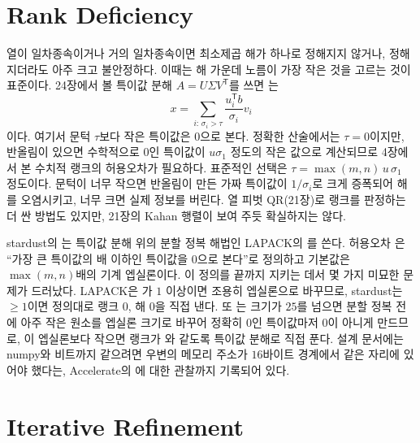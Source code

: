 \section{Rank Deficiency}
\label{sec:rank-deficient}

열이 일차종속이거나 거의 일차종속이면 최소제곱 해가 하나로 정해지지 않거나, 정해지더라도 아주 크고 불안정하다. 이때는 해 가운데 노름이 가장 작은 것을 고르는 것이 표준이다. 24장에서 볼 특이값 분해 $A=U\Sigma V^{\mathsf T}$를 쓰면 는
\[
x=\sum_{i:\,\sigma_i>\tau}\frac{u_i^{\mathsf T}b}{\sigma_i}v_i
\]
이다. 여기서 문턱 $\tau$보다 작은 특이값은 $0$으로 본다. 정확한 산술에서는 $\tau=0$이지만, 반올림이 있으면 수학적으로 $0$인 특이값이 $u\sigma_1$ 정도의 작은 값으로 계산되므로 4장에서 본 수치적 랭크의 허용오차가 필요하다. 표준적인 선택은 $\tau=\max(m,n)\,u\,\sigma_1$ 정도이다. 문턱이 너무 작으면 반올림이 만든 가짜 특이값이 $1/\sigma_i$로 크게 증폭되어 해를 오염시키고, 너무 크면 실제 정보를 버린다. 열 피벗 QR(21장)로 랭크를 판정하는 더 싼 방법도 있지만, 21장의 Kahan 행렬이 보여 주듯 확실하지는 않다.

\begin{instardust}
stardust의 는 특이값 분해 위의 분할 정복 해법인 LAPACK의 를 쓴다. 허용오차 은 ``가장 큰 특이값의 배 이하인 특이값을 $0$으로 본다''로 정의하고 기본값은 $\max(m,n)$배의 기계 엡실론이다. 이 정의를 끝까지 지키는 데서 몇 가지 미묘한 문제가 드러났다. LAPACK은 가 $1$ 이상이면 조용히 엡실론으로 바꾸므로, stardust는 $\ge1$이면 정의대로 랭크 $0$, 해 $0$을 직접 낸다. 또 는 크기가 $25$를 넘으면 분할 정복 전에 아주 작은 원소를 엡실론 크기로 바꾸어 정확히 $0$인 특이값마저 $0$이 아니게 만드므로, 이 엡실론보다 작으면 랭크가 와 같도록 특이값 분해로 직접 푼다. 설계 문서에는 numpy와 비트까지 같으려면 우변의 메모리 주소가 $16$바이트 경계에서 같은 자리에 있어야 했다는, Accelerate의 에 대한 관찰까지 기록되어 있다.
\end{instardust}

\section{Iterative Refinement}
\label{sec:ls-refinement}

